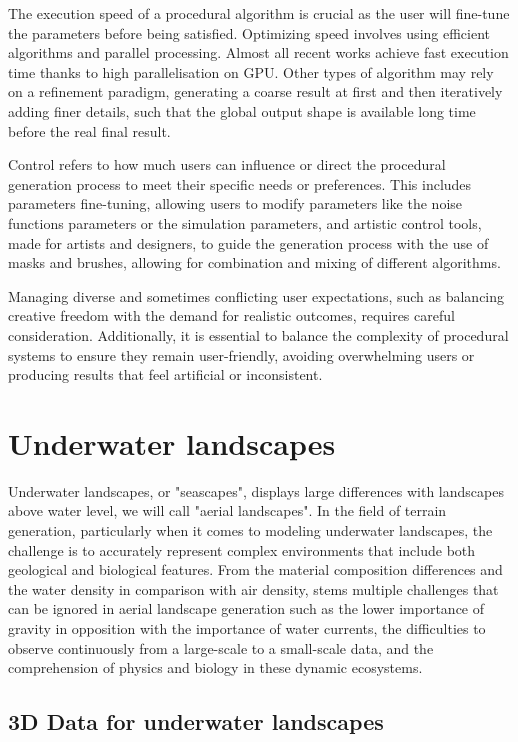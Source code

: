 The execution speed of a procedural algorithm is crucial as the user will fine-tune the parameters before being satisfied.
Optimizing speed involves using efficient algorithms and parallel processing. Almost all recent works achieve fast execution time thanks to high parallelisation on GPU. Other types of algorithm may rely on a refinement paradigm, generating a coarse result at first and then iteratively adding finer details, such that the global output shape is available long time before the real final result.

Control refers to how much users can influence or direct the procedural generation process to meet their specific needs or preferences. This includes parameters fine-tuning, allowing users to modify parameters like the noise functions parameters or the simulation parameters, and artistic control tools, made for artists and designers, to guide the generation process with the use of masks and brushes, allowing for combination and mixing of different algorithms.

Managing diverse and sometimes conflicting user expectations, such as balancing creative freedom with the demand for realistic outcomes, requires careful consideration. Additionally, it is essential to balance the complexity of procedural systems to ensure they remain user-friendly, avoiding overwhelming users or producing results that feel artificial or inconsistent.




\section{Underwater landscapes}
Underwater landscapes, or "seascapes", displays large differences with landscapes above water level, we will call "aerial landscapes". 
In the field of terrain generation, particularly when it comes to modeling underwater landscapes, the challenge is to accurately represent complex environments that include both geological and biological features. From the material composition differences and the water density in comparison with air density, stems multiple challenges that can be ignored in aerial landscape generation such as the lower importance of gravity in opposition with the importance of water currents, the difficulties to observe continuously from a large-scale to a small-scale data, and the comprehension of physics and biology in these dynamic ecosystems. 

\subsection{3D Data for underwater landscapes}

